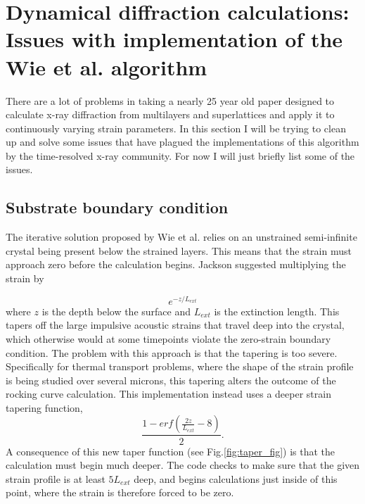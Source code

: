 \documentclass[letterpaper,11pt]{article}
\begin{document}
\section{Dynamical diffraction calculations: \\Issues with implementation of the Wie et al. algorithm}

There are a lot of problems in taking a nearly 25 year old paper designed to calculate x-ray diffraction from multilayers and superlattices and apply it to continuously varying strain parameters.  In this section I will be trying to clean up and solve some issues that have plagued the implementations of this algorithm by the time-resolved x-ray community.  For now I will just briefly list some of the issues.

\subsection{Substrate boundary condition}
The iterative solution proposed by Wie et al. relies on an unstrained semi-infinite crystal being present below the strained layers.  This means that the strain must approach zero before the calculation begins.  Jackson suggested multiplying the strain by

\begin{equation}
e^{-z/L_{ext}}
\end{equation}
where $z$ is the depth below the surface and $L_{ext}$ is the extinction length.  This tapers off the large impulsive acoustic strains that travel deep into the crystal, which otherwise would at some timepoints violate the zero-strain boundary condition.  The problem with this approach is that the tapering is too severe.  Specifically for thermal transport problems, where the shape of the strain profile is being studied over several microns, this tapering alters the outcome of the rocking curve calculation.  This implementation instead uses a deeper strain tapering function,
\begin{equation}
 \frac{1-erf\left(\frac{2z}{L_{ext}} - 8\right)}{2}.
\end{equation}
A consequence of this new taper function (see Fig.\ref{fig:taper_fig}) is that the calculation must begin much deeper.  The code checks to make sure that the given strain profile is at least $5L_{ext}$ deep, and begins calculations just inside of this point, where the strain is therefore forced to be zero.  
\end{document}
